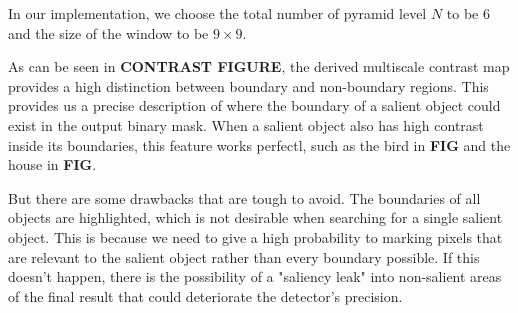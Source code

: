 \documentclass[10pt,twocolumn,letterpaper]{article}
\newcommand{\BOLD}{\textbf}
\begin{document}
In our implementation, we choose the total number of pyramid level $N$ to be $6$ and the size of the window to be $9 \times 9$. 

As can be seen in \BOLD{CONTRAST FIGURE}, the derived multiscale contrast map provides a high distinction between boundary and non-boundary regions. This provides us a precise description of where the boundary of a salient object could exist in the output binary mask. When a salient object also has high contrast inside its boundaries, this feature works perfectl, such as the bird in \BOLD{FIG} and the house in \BOLD{FIG}.

But there are some drawbacks that are tough to avoid. The boundaries of all objects are highlighted, which is not desirable when searching for a single salient object.  This is because we need to give a high probability to marking pixels that are relevant to the salient object rather than every boundary possible. If this doesn't happen, there is the possibility of a "saliency leak" into non-salient areas of the final result that could deteriorate the detector's precision.
\end{document}
